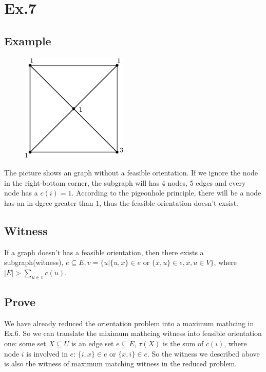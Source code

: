 	\section{Ex.7}
		\subsection{Example}
			\begin{figure}[H]
				\centering\includegraphics[width=2in]{source/qwd/qc.eps}
			\end{figure}
			The picture shows an graph without a feasible orientation. If we ignore the node in the right-bottom corner, the subgraph will has 4 nodes, 5 edges and every node has a $c(i)=1$. According to the pigeonhole principle, there will be a node has an in-dgree greater than $1$, thus the feasible orientation doesn't exsist.
		\subsection{Witness}
			If a graph doesn't has a feasible orientation, then there exists a subgraph(witness), $e\subseteq E,v=\{u|\{u,x\}\in e$ or $\{x,u\}\in e, x,u\in V\}$, where $|E|>\sum_{u\in v}c(u)$.
		\subsection{Prove}
			We have already reduced the orientation problem into a maximum mathcing in Ex.6. So we can translate the miximum mathcing witness into feasible orientation one: some set $X\subseteq U$ is an edge set $e\subseteq E$, $\tau (X)$ is the sum of $c(i)$, where node $i$ is involved in $e$: $\{i, x\}\in e$ or $\{x, i\} \in e$. So the witness we described above is also the witness of maximum matching witness in the reduced problem.
